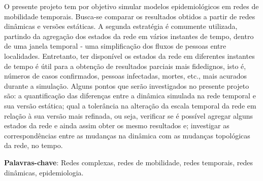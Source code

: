 \documentclass[
	12pt,				%
	openright,			%
	oneside,			%
	a4paper,			%
	chapter=TITLE,		%
	english,			%
	brazil				%
	]{abntex2temp} %
\begin{document}
\frenchspacing 
\imprimircapa
\setlength{\absparsep}{18pt} %
\begin{resumo}
 \noindent O presente projeto tem por objetivo simular modelos epidemiológicos em redes de mobilidade temporais. Busca-se comparar os resultados obtidos a partir de redes dinâmicas e versões estáticas. A segunda estratégia é comumente utilizada, partindo da agregação dos estados da rede em vários instantes de tempo, dentro de uma janela temporal - uma simplificação dos fluxos de pessoas entre localidades. Entretanto, ter disponível os estados da rede em diferentes instantes de tempo é útil para a obtenção de resultados parciais mais fidedignos, isto é, números de casos confirmados, pessoas infectadas, mortes, etc., mais acurados durante a simulação. Alguns pontos que serão investigados no presente projeto são: a quantificação das diferenças entre a dinâmica simulada na rede temporal e sua versão estática; qual a tolerância na alteração da escala temporal da rede em relação à sua versão mais refinada, ou seja, verificar se é possível agregar alguns estados da rede e ainda assim obter os mesmo resultados e; investigar as correspondências entre as mudanças na dinâmica com as mudanças topológicas da rede, no tempo.

 \textbf{Palavras-chave}: Redes complexas, redes de mobilidade, redes temporais, redes dinâmicas, epidemiologia.
\end{resumo}

\end{document}
